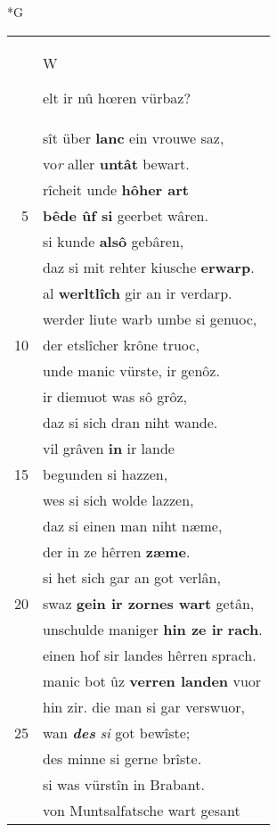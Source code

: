 \documentclass[8pt,a4paper,notitlepage]{article}
\begin{document}
\begin{table}[ht]
\begin{minipage}[t]{0.5\linewidth}
\small
\begin{center}*G
\end{center}
\begin{tabular}{rl}
 & \begin{large}W\end{large}elt ir nû hœren vürbaz?\\ 
 & sît über \textbf{lanc} ein vrouwe saz,\\ 
 & vo\textit{r} aller \textbf{untât} bewart.\\ 
 & rîcheit unde \textbf{hôher art}\\ 
5 & \textbf{bêde ûf si} geerbet wâren.\\ 
 & si kunde \textbf{alsô} gebâren,\\ 
 & daz si mit rehter kiusche \textbf{erwarp}.\\ 
 & al \textbf{werltlîch} gir an ir verdarp.\\ 
 & werder liute warb umbe si genuoc,\\ 
10 & der etslîcher krône truoc,\\ 
 & unde manic vürste, ir genôz.\\ 
 & ir diemuot was sô grôz,\\ 
 & daz si sich dran niht wande.\\ 
 & vil grâven \textbf{in} ir lande\\ 
15 & begunden si hazzen,\\ 
 & wes si sich wolde lazzen,\\ 
 & daz si einen man niht næme,\\ 
 & der in ze hêrren \textbf{zæme}.\\ 
 & si het sich gar an got verlân,\\ 
20 & swaz \textbf{gein ir zornes wart} getân,\\ 
 & unschulde maniger \textbf{hin ze ir} \textbf{rach}.\\ 
 & einen hof sir landes hêrren sprach.\\ 
 & manic bot ûz \textbf{verren landen} vuor\\ 
 & hin zir. die man si gar verswuor,\\ 
25 & wan \textit{\textbf{des}} \textit{si} got bewîste;\\ 
 & des minne si gerne brîste.\\ 
 & si was vürstîn in Brabant.\\ 
 & von Muntsalfatsche wart gesant\\ 

\end{tabular}
\end{minipage}
\end{table}
\end{document}
